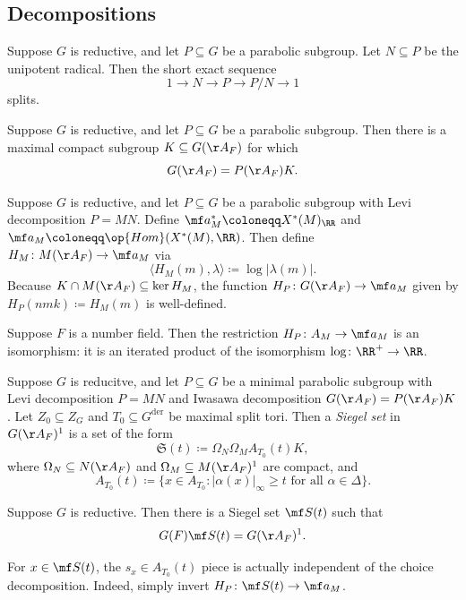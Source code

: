 \documentclass{article}
\begin{document}
\subsection{Decompositions}
\begin{theorem}[Levi]
	Suppose $G$ is reductive, and let $P\subseteq G$ be a parabolic subgroup. Let $N\subseteq P$ be the unipotent radical. Then the short exact sequence
	\[1\to N\to P\to P/N\to1\]
	splits.
\end{theorem}
\begin{theorem}[Iwasawa]
	Suppose $G$ is reductive, and let $P\subseteq G$ be a parabolic subgroup. Then there is a maximal compact subgroup $K\subseteq G(\AA_F)$ for which
	\[G(\AA_F)=P(\AA_F)K.\]
\end{theorem}
\begin{notation}
	Suppose $G$ is reductive, and let $P\subseteq G$ be a parabolic subgroup with Levi decomposition $P=MN$. Define $\mf a_M^*\coloneqq X^*(M)_\RR$ and $\mf a_M\coloneqq\op{Hom}(X^*(M),\RR)$. Then define $H_M\colon M(\AA_F)\to\mf a_M$ via
	\[\langle H_M(m),\lambda\rangle\coloneqq\log\left|\lambda(m)\right|.\]
	Because $K\cap M(\AA_F)\subseteq\ker H_M$, the function $H_P\colon G(\AA_F)\to\mf a_M$ given by $H_P(nmk)\coloneqq H_M(m)$ is well-defined.
\end{notation}
\begin{remark}
	Suppose $F$ is a number field. Then the restriction $H_P\colon A_M\to\mf a_M$ is an isomorphism: it is an iterated product of the isomorphism $\log\colon\RR^+\to\RR$.
\end{remark}
\begin{definition}
	Suppose $G$ is reducitve, and let $P\subseteq G$ be a minimal parabolic subgroup with Levi decomposition $P=MN$ and Iwasawa decomposition $G(\AA_F)=P(\AA_F)K$. Let $Z_0\subseteq Z_G$ and $T_0\subseteq G^{\mathrm{der}}$ be maximal split tori. Then a \textit{Siegel set} in $G(\AA_F)^1$ is a set of the form
	\[\mathfrak S(t)\coloneqq\Omega_N\Omega_MA_{T_0}(t)K,\]
	where $\Omega_N\subseteq N(\AA_F)$ and $\Omega_M\subseteq M(\AA_F)^1$ are compact, and
	\[A_{T_0}(t)\coloneqq\{x\in A_{T_0}:\left|\alpha(x)\right|_\infty\ge t\text{ for all }\alpha\in\Delta\}.\]
\end{definition}
\begin{theorem}
	Suppose $G$ is reductive. Then there is a Siegel set $\mf S(t)$ such that
	\[G(F)\mf S(t)=G(\AA_F)^1.\]
\end{theorem}
\begin{remark}
	For $x\in\mf S(t)$, the $s_x\in A_{T_0}(t)$ piece is actually independent of the choice decomposition. Indeed, simply invert $H_P\colon\mf S(t)\to\mf a_M$.
\end{remark}
\end{document}
